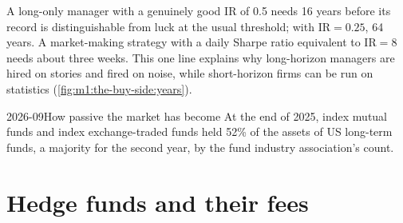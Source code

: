 \begin{example}\label{ex:m1:the-buy-side:sixteen}
A long-only manager with a genuinely good $\mathrm{IR}$ of 0.5 needs 16
years before its record is distinguishable from luck at the usual threshold;
with $\mathrm{IR} = 0.25$, 64 years. A market-making strategy with a daily
Sharpe ratio equivalent to $\mathrm{IR} = 8$ needs about three weeks. This one
line explains why long-horizon managers are hired on stories and fired on
noise, while short-horizon firms can be run on statistics
(\cref{fig:m1:the-buy-side:years}).
\end{example}

\begin{omfigure}

\label{fig:m1:the-buy-side:years}
\end{omfigure}

\begin{dated}{2026-09}{How passive the market has become}\label{dat:m1:the-buy-side:passive}
At the end of 2025, index mutual funds and index exchange-traded funds held
52\% of the assets of US long-term funds, a majority for the second year, by
the fund industry association's count.
\end{dated}

\section{Hedge funds and their fees}

